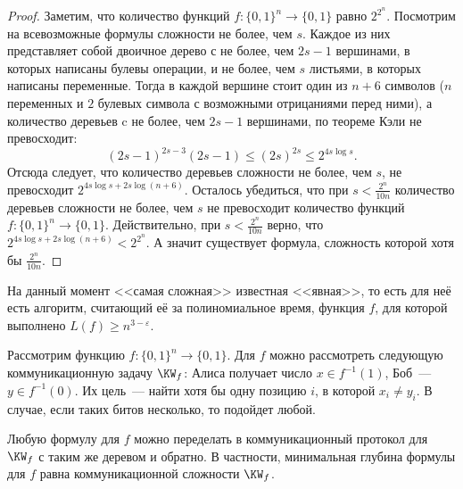 \begin{proof}
    Заметим, что количество функций $f\colon \{0, 1\}^n \to \{0, 1\}$ равно $2^{2^n}$. Посмотрим на
    всевозможные формулы сложности не более, чем $s$. Каждое из них представляет собой двоичное дерево
    с не более, чем $2s - 1$ вершинами, в которых написаны булевы операции, и не более, чем $s$ листьями,
    в которых написаны переменные. Тогда в каждой вершине стоит один из $n + 6$ символов ($n$ переменных и
    $2$ булевых символа с возможными отрицаниями перед ними), а количество деревьев c не более, чем
    $2s - 1$ вершинами, по теореме Кэли не превосходит:
    $$
        (2s - 1)^{2s - 3}(2s - 1) \le (2s)^{2s} \le 2^{4s \log s}.
    $$ 
    Отсюда следует, что количество деревьев сложности не более, чем $s$, не превосходит
    $2^{4s \log s + 2s \log(n + 6)}$. Осталось убедиться, что при $s < \frac{2^n}{10n}$ количество
    деревьев сложности не более, чем $s$ не превосходит количество функций
    $f\colon \{0, 1\}^n \to \{0, 1\}$. Действительно, при $s < \frac{2^n}{10n}$ верно, что
    $2^{4s\log s + 2s \log(n + 6)} < 2^{2^n}$. А значит существует формула, сложность которой хотя бы
    $\frac{2^n}{10n}$.
\end{proof}
    
На данный момент <<самая сложная>> известная <<явная>>, то есть для неё есть алгоритм, считающий её за
полиномиальное время, функция $f$, для которой выполнено $L(f) \geq n^{3 - \varepsilon}$.

Рассмотрим функцию $f\colon \{0, 1\}^n \to \{0, 1\}$. Для $f$ можно рассмотреть следующую
коммуникационную задачу $\KW_f$: Алиса получает число $x \in f^{-1}(1)$, Боб~--- $y \in f^{-1}(0)$. Их
цель~--- найти хотя бы одну позицию $i$, в которой $x_i \ne y_i$. В случае, если таких битов несколько,
то подойдет любой.

\begin{theorem}
    \label{th:KW-theorem}
    Любую формулу для $f$ можно переделать в коммуникационный протокол для $\KW_f$ с таким же деревом и
    обратно. В частности, минимальная глубина формулы для $f$ равна коммуникационной сложности $\KW_f$.
\end{theorem}

